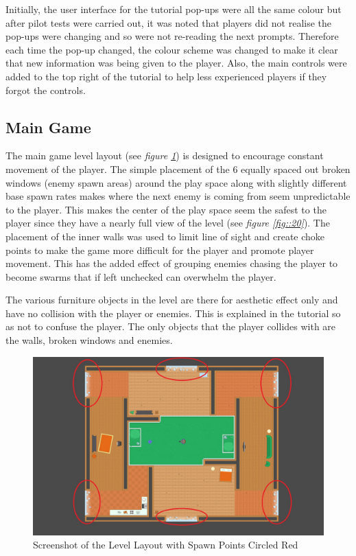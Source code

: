 \documentclass[journal]{IEEEtran}
\begin{document}
Initially, the user interface for the tutorial pop-ups were all the same colour but after pilot tests were carried out, it was noted that players did not realise the pop-ups were changing and so were not re-reading the next prompts. Therefore each time the pop-up changed, the colour scheme was changed to make it clear that new information was being given to the player. Also, the main controls were added to the top right of the tutorial to help less experienced players if they forgot the controls. 

\subsection{Main Game}
The main game level layout (see \textit{figure \ref{fig::3}}) is designed to encourage constant movement of the player. The simple placement of the 6 equally spaced out broken windows (enemy spawn areas) around the play space along with slightly different base spawn rates makes where the next enemy is coming from seem unpredictable to the player. This makes the center of the play space seem the safest to the player since they have a nearly full view of the level (see \textit{figure \ref{fig::20}}). The placement of the inner walls was used to limit line of sight and create choke points to make the game more difficult for the player and promote player movement. This has the added effect of grouping enemies chasing the player to become swarms that if left unchecked can overwhelm the player.

The various furniture objects in the level are there for aesthetic effect only and have no collision with the player or enemies. This is explained in the tutorial so as not to confuse the player. The only objects that the player collides with are the walls, broken windows and enemies.


\begin{figure}[h]
	\includegraphics[width=1.0\linewidth]{artefactscreenshotlevelspawns.jpg}
	\caption{Screenshot of the Level Layout with Spawn Points Circled Red}
	\label{fig::3}
\end{figure} 
\end{document}
